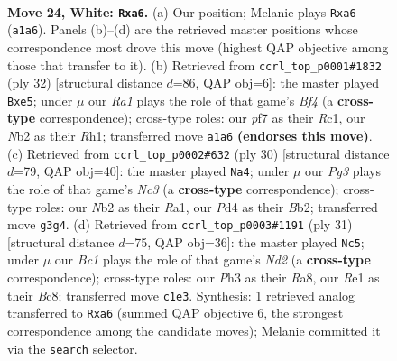 \documentclass[11pt]{article}
\begin{document}
\clearpage

\begin{figure}[p]\centering
\begin{subfigure}{0.46\textwidth}\centering
\resizebox{\linewidth}{!}{%
\newchessgame
\chessboard[
  setfen={2r1b1k1/p1r2pp1/n3pn2/1p5p/3P1P2/1P4PP/1N2P3/R1B1RBK1 w - - 1 24},
  showmover=false,
  pgfstyle=straightmove, color=movearrow, markmove={a1-a6}
]}
\caption{}
\end{subfigure}\hfill
\begin{subfigure}{0.46\textwidth}\centering
\resizebox{\linewidth}{!}{%
\newchessgame
\chessboard[
  setfen={r4rk1/4p2p/2p2pp1/pp2n3/4PBbP/P7/1P3PP1/2R1KB1R w K - 0 17},
  showmover=false,
  pgfstyle=straightmove, color=movearrow, markmove={f4-e5}
]}
\caption{}
\end{subfigure}
\\[4pt]
\begin{subfigure}{0.46\textwidth}\centering
\resizebox{\linewidth}{!}{%
\newchessgame
\chessboard[
  setfen={r1b1k2r/1p1n1ppp/p3p3/2p1n3/2P5/2N1P3/PB1RB1PP/R5K1 w kq - 0 16},
  showmover=false,
  pgfstyle=straightmove, color=movearrow, markmove={c3-a4}
]}
\caption{}
\end{subfigure}\hfill
\begin{subfigure}{0.46\textwidth}\centering
\resizebox{\linewidth}{!}{%
\newchessgame
\chessboard[
  setfen={r1b1r1k1/1p1n2bp/2p3p1/5p2/P1P5/2N1P1P1/PB3PBP/1R1R2K1 b - - 0 16},
  showmover=false,
  pgfstyle=straightmove, color=movearrow, markmove={d7-c5}
]}
\caption{}
\end{subfigure}
\caption{\textbf{Move 24, White: \texttt{Rxa6}.} (a) Our position; Melanie plays \texttt{Rxa6} (\texttt{a1a6}). Panels (b)--(d) are the retrieved master positions whose correspondence most drove this move (highest QAP objective among those that transfer to it). (b) Retrieved from \texttt{ccrl\_top\_p0001\#1832} (ply 32) [structural distance $d$=86, QAP obj=6]: the master played \texttt{Bxe5}; under $\mu$ our \emph{Ra1} plays the role of that game's \emph{Bf4} (a \textbf{cross-type} correspondence); cross-type roles: our \emph{p}f7 as their \emph{R}c1, our \emph{N}b2 as their \emph{R}h1; transferred move \texttt{a1a6} \textbf{(endorses this move)}. (c) Retrieved from \texttt{ccrl\_top\_p0002\#632} (ply 30) [structural distance $d$=79, QAP obj=40]: the master played \texttt{Na4}; under $\mu$ our \emph{Pg3} plays the role of that game's \emph{Nc3} (a \textbf{cross-type} correspondence); cross-type roles: our \emph{N}b2 as their \emph{R}a1, our \emph{P}d4 as their \emph{B}b2; transferred move \texttt{g3g4}. (d) Retrieved from \texttt{ccrl\_top\_p0003\#1191} (ply 31) [structural distance $d$=75, QAP obj=36]: the master played \texttt{Nc5}; under $\mu$ our \emph{Bc1} plays the role of that game's \emph{Nd2} (a \textbf{cross-type} correspondence); cross-type roles: our \emph{P}h3 as their \emph{R}a8, our \emph{R}e1 as their \emph{B}c8; transferred move \texttt{c1e3}. Synthesis: 1 retrieved analog transferred to \texttt{Rxa6} (summed QAP objective 6, the strongest correspondence among the candidate moves); Melanie committed it via the \texttt{search} selector.}
\label{fig:thought-m46}
\end{figure}
\end{document}
